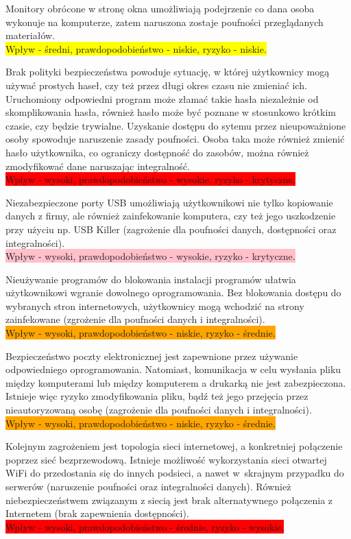 Monitory obrócone w stronę okna umożliwiają podejrzenie co dana osoba wykonuje na komputerze, zatem naruszona zostaje poufności przeglądanych materiałów. \\ \colorbox{yellow}{Wpływ - średni, prawdopodobieństwo - niskie, ryzyko - niskie.}

Brak polityki bezpieczeństwa powoduje sytuację, w której użytkownicy mogą używać prostych haseł, czy też przez długi okres czasu nie zmieniać ich. Uruchomiony odpowiedni program może złamać takie hasła niezależnie od skomplikowania hasła, również hasło może być poznane w stosunkowo krótkim czasie, czy będzie trywialne. Uzyskanie dostępu do sytemu przez nieupoważnione osoby spowoduje naruszenie zasady poufności. Osoba taka może również zmienić hasło użytkownika, co ograniczy dostępność do zasobów, można również zmodyfikować dane naruszając integralność. \\  \colorbox{red}{Wpływ - wysoki, prawdopodobieństwo - wysokie, ryzyko - krytyczne.}

Niezabezpieczone porty USB umożliwiają użytkownikowi nie tylko kopiowanie danych z firmy, ale również zainfekowanie komputera, czy też jego uszkodzenie przy użyciu np. USB Killer (zagrożenie dla poufności danych, dostępności oraz integralności). \\ \colorbox{pink}{Wpływ - wysoki, prawdopodobieństwo - wysokie, ryzyko - krytyczne.}

Nieużywanie programów do blokowania instalacji programów ułatwia użytkownikowi wgranie dowolnego oprogramowania. Bez blokowania  dostępu do wybranych stron internetowych, użytkownicy mogą wchodzić na strony zainfekowane (zgrożenie dla poufności danych i integralności). \\ \colorbox{orange}{Wpływ - wysoki, prawdopodobieństwo - niskie, ryzyko - średnie.} 

Bezpieczeństwo poczty elektronicznej jest zapewnione przez używanie odpowiedniego oprogramowania. Natomiast, komunikacja w celu wysłania pliku między komputerami lub między komputerem a drukarką nie jest zabezpieczona. Istnieje więc ryzyko zmodyfikowania pliku, bądź też jego przejęcia przez nieautoryzowaną osobę  (zagrożenie dla poufności danych i integralności). \\   \colorbox{orange}{Wpływ - wysoki, prawdopodobieństwo - niskie, ryzyko - średnie.}  

Kolejnym zagrożeniem jest topologia sieci internetowej, a konkretniej połączenie poprzez sieć bezprzewodową. Istnieje możliwość wykorzystania sieci otwartej WiFi do przedostania się do innych podsieci, a nawet \linebreak w~skrajnym przypadku do serwerów (naruszenie poufności oraz integralności danych). Również niebezpieczeństwem \linebreak związanym z siecią jest brak alternatywnego połączenia z Internetem (brak zapewnienia dostępności). \\ \colorbox{red}{Wpływ - wysoki, prawdopodobieństwo - średnie, ryzyko - wysokie.}


% 
